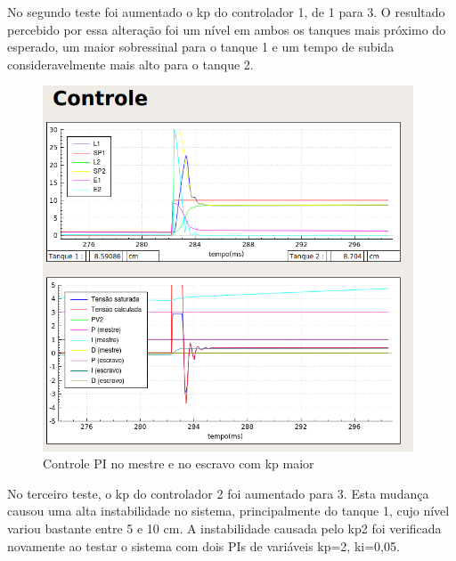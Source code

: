 \documentclass[a4paper,12pt]{article}
\begin{document}
No segundo teste foi aumentado o kp do controlador 1, de 1 para 3. O resultado percebido por essa alteração foi um nível em ambos os tanques mais próximo do esperado, um maior sobressinal para o tanque 1 e um tempo de subida consideravelmente mais alto para o tanque 2.
\newpage
\begin{figure}[!h]
\centering
\includegraphics[width=11cm]{ImagensLab4/0.png}
\caption{Controle PI no mestre e no escravo com kp maior}
\label{img1}
\end{figure}

No terceiro teste, o kp do controlador 2 foi aumentado para 3. Esta mudança causou uma alta instabilidade no sistema, principalmente do tanque 1, cujo nível variou bastante entre 5 e 10 cm. A instabilidade causada pelo kp2 foi verificada novamente ao testar o sistema com dois PIs de variáveis kp=2, ki=0,05.
\end{document}
